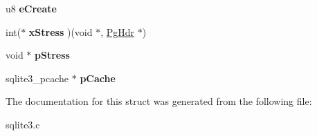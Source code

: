 \begin{DoxyCompactItemize}
\item 
u8 {\bfseries e\+Create}\hypertarget{structPCache_a28629953493154d29ab7b6485a0471bf}{}\label{structPCache_a28629953493154d29ab7b6485a0471bf}

\item 
int($\ast$ {\bfseries x\+Stress} )(void $\ast$, \hyperlink{structPgHdr}{Pg\+Hdr} $\ast$)\hypertarget{structPCache_a51b67ce6c17cbd7124c50d8a2d0fed50}{}\label{structPCache_a51b67ce6c17cbd7124c50d8a2d0fed50}

\item 
void $\ast$ {\bfseries p\+Stress}\hypertarget{structPCache_af04a2ea8a2c6d6b3eea7bb7051b8f447}{}\label{structPCache_af04a2ea8a2c6d6b3eea7bb7051b8f447}

\item 
sqlite3\+\_\+pcache $\ast$ {\bfseries p\+Cache}\hypertarget{structPCache_ad0248655d30d327e0eeced6c3651b161}{}\label{structPCache_ad0248655d30d327e0eeced6c3651b161}

\end{DoxyCompactItemize}


The documentation for this struct was generated from the following file\+:\begin{DoxyCompactItemize}
\item 
sqlite3.\+c\end{DoxyCompactItemize}
